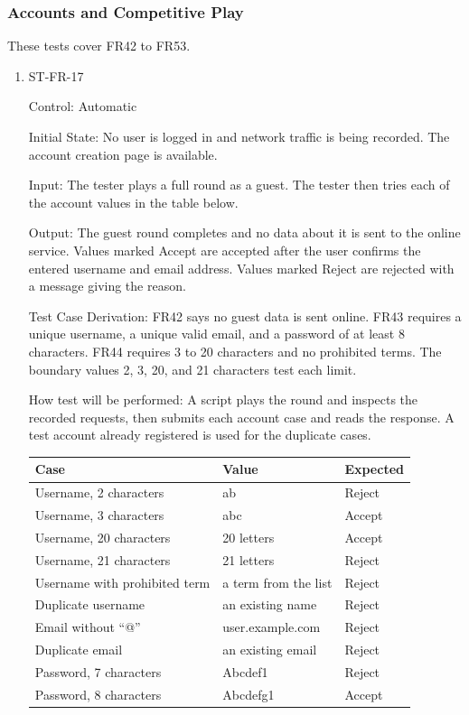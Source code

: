\documentclass[12pt, titlepage]{article}
\begin{document}
\subsubsection{Accounts and Competitive Play}

These tests cover FR42 to FR53.

\begin{enumerate}

\item{ST-FR-17\\}

Control: Automatic

Initial State: No user is logged in and network traffic is being recorded. The account creation page is available.

Input: The tester plays a full round as a guest. The tester then tries each of the account values in the table below.

Output: The guest round completes and no data about it is sent to the online service. Values marked Accept are accepted after the user confirms the entered username and email address. Values marked Reject are rejected with a message giving the reason.

Test Case Derivation: FR42 says no guest data is sent online. FR43 requires a unique username, a unique valid email, and a password of at least 8 characters. FR44 requires 3 to 20 characters and no prohibited terms. The boundary values 2, 3, 20, and 21 characters test each limit.

How test will be performed: A script plays the round and inspects the recorded requests, then submits each account case and reads the response. A test account already registered is used for the duplicate cases.

\begin{center}
\begin{tabular}{lll}
\toprule
\textbf{Case} & \textbf{Value} & \textbf{Expected}\\
\midrule
Username, 2 characters & ab & Reject\\
Username, 3 characters & abc & Accept\\
Username, 20 characters & 20 letters & Accept\\
Username, 21 characters & 21 letters & Reject\\
Username with prohibited term & a term from the list & Reject\\
Duplicate username & an existing name & Reject\\
Email without ``@'' & user.example.com & Reject\\
Duplicate email & an existing email & Reject\\
Password, 7 characters & Abcdef1 & Reject\\
Password, 8 characters & Abcdefg1 & Accept\\
\bottomrule
\end{tabular}
\end{center}


\end{enumerate}
\end{document}
